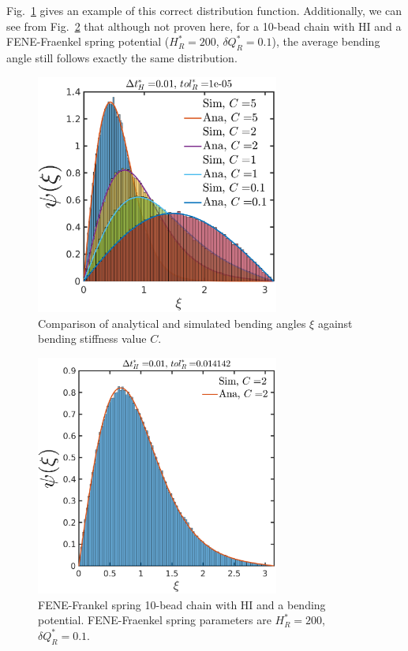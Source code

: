 \documentclass{article}
\begin{document}
\begin{enumerate}
Fig.~\ref{C curves no HI 3 beads} gives an example of this correct distribution function. Additionally, we can see from Fig.~\ref{Bending dist FF 10 beads HI} that although not proven here, for a 10-bead chain with HI and a FENE-Fraenkel spring potential ($H^*_R = 200$, $\delta Q^*_R = 0.1$), the average bending angle still follows exactly the same distribution.
\begin{figure}[!ht]
    \centering
    \includegraphics[width=8cm,height=!]{C_curves.eps}
    \caption{Comparison of analytical and simulated bending angles $\xi$ against bending stiffness value $C$.}
    \label{C curves no HI 3 beads}
\end{figure}

\begin{figure}[!ht]
    \centering
    \includegraphics[width=8cm,height=!]{Bending_dist_10_beads_FF_HI.eps}
    \caption{FENE-Frankel spring 10-bead chain with HI and a bending potential. FENE-Fraenkel spring parameters are $H^*_R = 200$, $\delta Q^*_R = 0.1$.}
    \label{Bending dist FF 10 beads HI}
\end{figure}

\end{enumerate}
\end{document}
